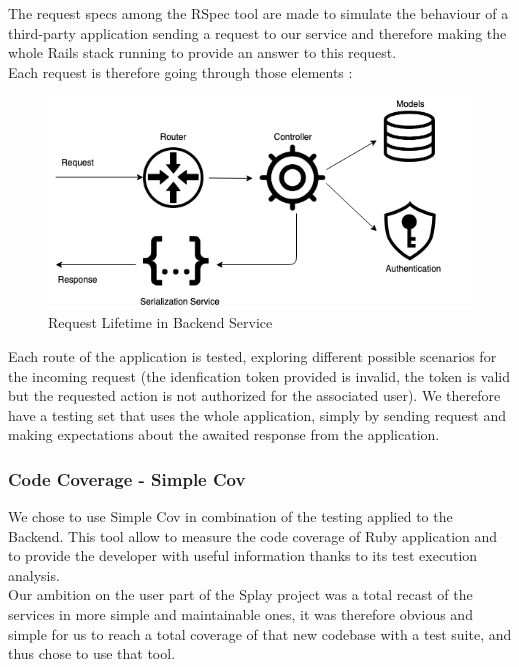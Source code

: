 \documentclass{eplmastersthesis}
\begin{document}
          The request specs among the RSpec tool are made to simulate
          the behaviour of a third-party application sending a request to
          our service and therefore making the whole Rails stack running
          to provide an answer to this request.\\
          Each request is therefore going through those elements :\\

          \begin{figure}[H]
            \centering
            \includegraphics[scale=0.6]{figures/request_test.png}
            \caption{\label{request_test} Request Lifetime in Backend Service}
          \end{figure}

          Each route of the application is tested, exploring different possible
          scenarios for the incoming request (the idenfication token provided
          is invalid, the token is valid but the requested action is not
          authorized for the associated user). We therefore have a testing set
          that uses the whole application, simply by sending request and
          making expectations about the awaited response from the application.

        \subsubsection{Code Coverage - Simple Cov}

          We chose to use Simple Cov in combination of the testing applied to
          the Backend. This tool allow to measure the code coverage of Ruby
          application and to provide the developer with useful information
          thanks to its test execution analysis.\\

          Our ambition on the user part of the Splay project was a total recast of
          the services in more simple and maintainable ones, it was therefore
          obvious and simple for us to reach a total coverage of that new codebase
          with a test suite, and thus chose to use that tool.\\
\end{document}
